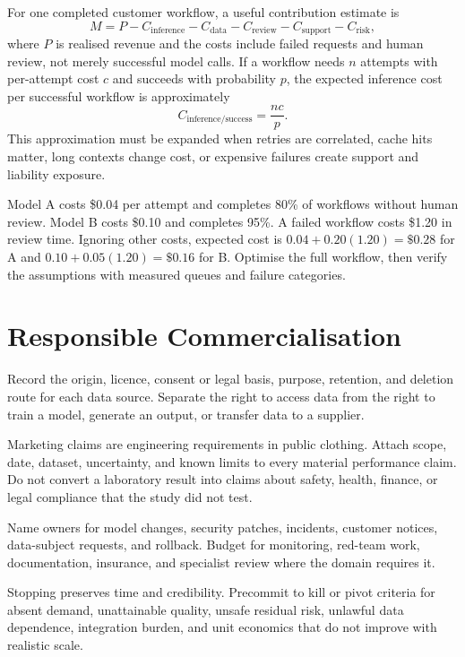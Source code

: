 For one completed customer workflow, a useful contribution estimate is
\begin{equation}
  M = P - C_{\mathrm{inference}} - C_{\mathrm{data}}
      - C_{\mathrm{review}} - C_{\mathrm{support}} - C_{\mathrm{risk}},
\end{equation}
where $P$ is realised revenue and the costs include failed requests and human
review, not merely successful model calls.
If a workflow needs $n$ attempts with per-attempt cost $c$ and succeeds with
probability $p$, the expected inference cost per successful workflow is
approximately
\begin{equation}
  C_{\mathrm{inference/success}} = \frac{n c}{p}.
\end{equation}
This approximation must be expanded when retries are correlated, cache hits
matter, long contexts change cost, or expensive failures create support and
liability exposure.

\begin{workedexample}
Model A costs \$0.04 per attempt and completes 80\% of workflows without human
review.
Model B costs \$0.10 and completes 95\%.
A failed workflow costs \$1.20 in review time.
Ignoring other costs, expected cost is
$0.04 + 0.20(1.20)=\$0.28$ for A and
$0.10 + 0.05(1.20)=\$0.16$ for B.
Optimise the full workflow, then verify the assumptions with measured queues
and failure categories.
\end{workedexample}

\section{Responsible Commercialisation}

\begin{tcbitemize}[skin=sectionraster]
\tcbitem[title={Data and Rights},raster multicolumn=3]
Record the origin, licence, consent or legal basis, purpose, retention, and
deletion route for each data source.
Separate the right to access data from the right to train a model, generate an
output, or transfer data to a supplier.

\tcbitem[title={Claims and Sales},raster multicolumn=3]
Marketing claims are engineering requirements in public clothing.
Attach scope, date, dataset, uncertainty, and known limits to every material
performance claim.
Do not convert a laboratory result into claims about safety, health, finance,
or legal compliance that the study did not test.

\tcbitem[title={Operating Responsibility},raster multicolumn=3]
Name owners for model changes, security patches, incidents, customer notices,
data-subject requests, and rollback.
Budget for monitoring, red-team work, documentation, insurance, and specialist
review where the domain requires it.

\tcbitem[title={Kill Criteria Are an Asset},raster multicolumn=3]
Stopping preserves time and credibility.
Precommit to kill or pivot criteria for absent demand, unattainable quality,
unsafe residual risk, unlawful data dependence, integration burden, and unit
economics that do not improve with realistic scale.
\end{tcbitemize}

